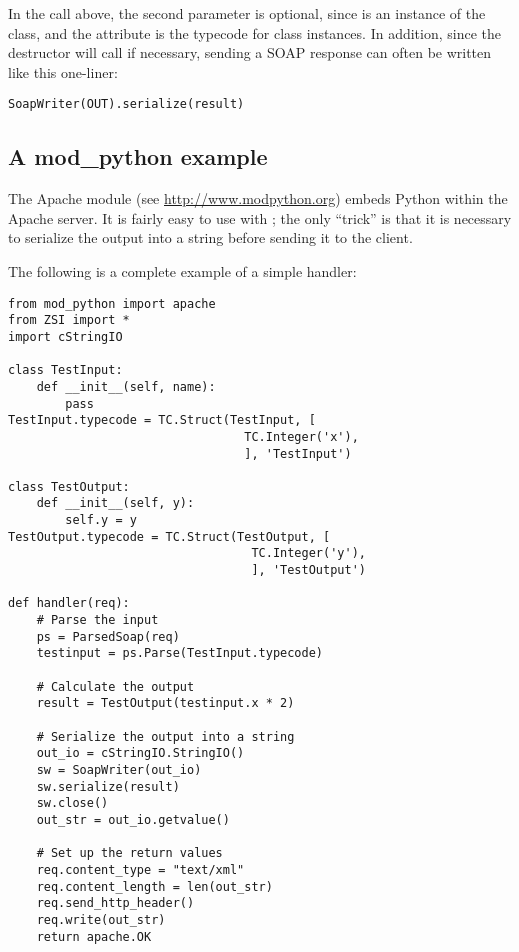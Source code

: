 In the  call above, the second parameter is optional,
since  is an instance of the 
 class, and the  attribute is
the typecode for class instances.
In addition, since the  destructor will call 
if necessary, sending a SOAP response can often be written like
this one-liner:
\begin{verbatim}
SoapWriter(OUT).serialize(result)
\end{verbatim}


\subsection{A mod_python example}

The Apache module  (see
\url{http://www.modpython.org}) embeds Python within the Apache server.
It is fairly easy to use \ZSI{} with ; the only ``trick''
is that it is necessary to serialize the output into a string before
sending it to the client.

The following is a complete example of a simple handler:

\begin{verbatim}
from mod_python import apache
from ZSI import *
import cStringIO

class TestInput:
    def __init__(self, name):
        pass
TestInput.typecode = TC.Struct(TestInput, [
                                 TC.Integer('x'),
                                 ], 'TestInput')

class TestOutput:
    def __init__(self, y):
        self.y = y
TestOutput.typecode = TC.Struct(TestOutput, [
                                  TC.Integer('y'),
                                  ], 'TestOutput')

def handler(req):
    # Parse the input
    ps = ParsedSoap(req)
    testinput = ps.Parse(TestInput.typecode)

    # Calculate the output
    result = TestOutput(testinput.x * 2)

    # Serialize the output into a string
    out_io = cStringIO.StringIO()
    sw = SoapWriter(out_io)
    sw.serialize(result)
    sw.close()
    out_str = out_io.getvalue()

    # Set up the return values
    req.content_type = "text/xml"
    req.content_length = len(out_str)
    req.send_http_header()
    req.write(out_str)
    return apache.OK
\end{verbatim}



